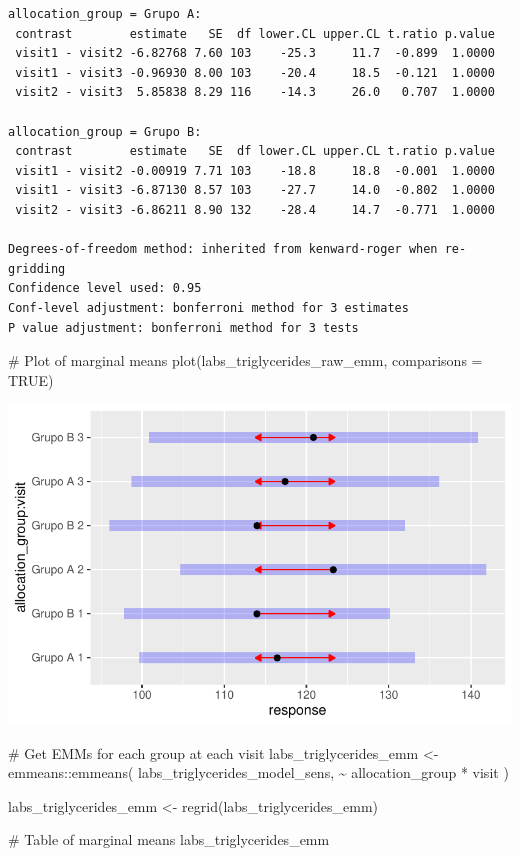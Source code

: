 \documentclass[
  letterpaper,
  DIV=11,
  numbers=noendperiod]{scrartcl}
\newenvironment{Shaded}{\begin{snugshade}}{\end{snugshade}}
\newcommand{\AttributeTok}[1]{\textcolor[rgb]{0.40,0.45,0.13}{#1}}
\newcommand{\CommentTok}[1]{\textcolor[rgb]{0.37,0.37,0.37}{#1}}
\newcommand{\ConstantTok}[1]{\textcolor[rgb]{0.56,0.35,0.01}{#1}}
\newcommand{\FunctionTok}[1]{\textcolor[rgb]{0.28,0.35,0.67}{#1}}
\newcommand{\NormalTok}[1]{\textcolor[rgb]{0.00,0.23,0.31}{#1}}
\newcommand{\OtherTok}[1]{\textcolor[rgb]{0.00,0.23,0.31}{#1}}
\newcommand{\SpecialCharTok}[1]{\textcolor[rgb]{0.37,0.37,0.37}{#1}}
\begin{document}
\begin{verbatim}
allocation_group = Grupo A:
 contrast        estimate   SE  df lower.CL upper.CL t.ratio p.value
 visit1 - visit2 -6.82768 7.60 103    -25.3     11.7  -0.899  1.0000
 visit1 - visit3 -0.96930 8.00 103    -20.4     18.5  -0.121  1.0000
 visit2 - visit3  5.85838 8.29 116    -14.3     26.0   0.707  1.0000

allocation_group = Grupo B:
 contrast        estimate   SE  df lower.CL upper.CL t.ratio p.value
 visit1 - visit2 -0.00919 7.71 103    -18.8     18.8  -0.001  1.0000
 visit1 - visit3 -6.87130 8.57 103    -27.7     14.0  -0.802  1.0000
 visit2 - visit3 -6.86211 8.90 132    -28.4     14.7  -0.771  1.0000

Degrees-of-freedom method: inherited from kenward-roger when re-gridding 
Confidence level used: 0.95 
Conf-level adjustment: bonferroni method for 3 estimates 
P value adjustment: bonferroni method for 3 tests 
\end{verbatim}

\begin{Shaded}
\begin{Highlighting}[]
\CommentTok{\# Plot of marginal means}
\FunctionTok{plot}\NormalTok{(labs\_triglycerides\_raw\_emm, }\AttributeTok{comparisons =} \ConstantTok{TRUE}\NormalTok{)}
\end{Highlighting}
\end{Shaded}

\includegraphics{Outcomes_V1V2V3_files/figure-pdf/labs_triglycerides_raw_emm-1.pdf}

\begin{Shaded}
\begin{Highlighting}[]
\CommentTok{\# Get EMMs for each group at each visit}
\NormalTok{labs\_triglycerides\_emm }\OtherTok{\textless{}{-}}\NormalTok{ emmeans}\SpecialCharTok{::}\FunctionTok{emmeans}\NormalTok{(}
\NormalTok{    labs\_triglycerides\_model\_sens, }
    \SpecialCharTok{\textasciitilde{}}\NormalTok{ allocation\_group }\SpecialCharTok{*}\NormalTok{ visit}
\NormalTok{)}

\NormalTok{labs\_triglycerides\_emm }\OtherTok{\textless{}{-}} \FunctionTok{regrid}\NormalTok{(labs\_triglycerides\_emm)}

\CommentTok{\# Table of marginal means}
\NormalTok{labs\_triglycerides\_emm}
\end{Highlighting}
\end{Shaded}
\end{document}
